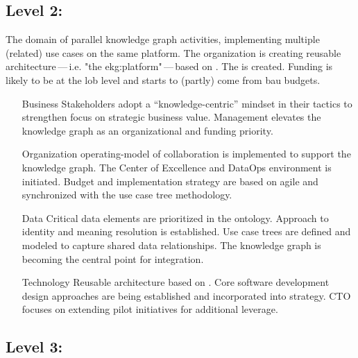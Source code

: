 \subsection{Level 2: \ekgmmLevelTwoLabel}

The domain of parallel knowledge graph activities, implementing multiple (related) use cases on the same platform.
The organization is creating reusable architecture\,---\,i.e. "the \gls{ekg:platform}"\,---\,based
on .
The  is created.
Funding is likely to be at the \gls{lob} level and starts to (partly) come from \gls{bau} budgets.

\begin{itemize}[leftmargin=1in,font=\bfseries]

    \item[Business]     Stakeholders adopt a “knowledge-centric” mindset in their tactics to strengthen focus on
                        strategic business value.
                        Management elevates the knowledge graph as an organizational and funding priority.
    \item[Organization] \Gls{operating-model} of collaboration is implemented to support the knowledge graph.
                        The Center of Excellence and DataOps environment is initiated.
                        Budget and implementation strategy are based on agile and synchronized with the
                        use case tree methodology.
    \item[Data]         Critical data elements are prioritized in the ontology.
                        Approach to identity and meaning resolution is established.
                        Use case trees are defined and modeled to capture shared data relationships.
                        The knowledge graph is becoming the central point for integration.
    \item[Technology]   Reusable architecture based on .
                        Core software development design approaches are being established and incorporated
                        into strategy.
                        CTO focuses on extending pilot initiatives for additional leverage.
\end{itemize}

\subsection{Level 3: \ekgmmLevelThreeLabel}

